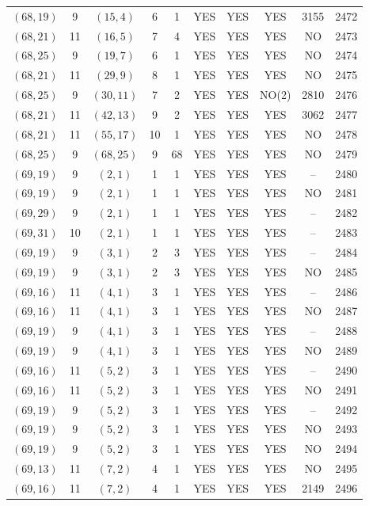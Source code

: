 \begin{longtable}{|c|c|c|c|c|c|c|c|c|c|}
$(68, 19)$ & 9 & $(15, 4)$ & 6 & 1 & YES & YES & YES & 3155 & 2472\\
$(68, 21)$ & 11 & $(16, 5)$ & 7 & 4 & YES & YES & YES & NO & 2473\\
$(68, 25)$ & 9 & $(19, 7)$ & 6 & 1 & YES & YES & YES & NO & 2474\\
$(68, 21)$ & 11 & $(29, 9)$ & 8 & 1 & YES & YES & YES & NO & 2475\\
$(68, 25)$ & 9 & $(30, 11)$ & 7 & 2 & YES & YES & NO(2) & 2810 & 2476\\
$(68, 21)$ & 11 & $(42, 13)$ & 9 & 2 & YES & YES & YES & 3062 & 2477\\
$(68, 21)$ & 11 & $(55, 17)$ & 10 & 1 & YES & YES & YES & NO & 2478\\
$(68, 25)$ & 9 & $(68, 25)$ & 9 & 68 & YES & YES & YES & NO & 2479\\
$(69, 19)$ & 9 & $(2, 1)$ & 1 & 1 & YES & YES & YES & -- & 2480\\
$(69, 19)$ & 9 & $(2, 1)$ & 1 & 1 & YES & YES & YES & NO & 2481\\
$(69, 29)$ & 9 & $(2, 1)$ & 1 & 1 & YES & YES & YES & -- & 2482\\
$(69, 31)$ & 10 & $(2, 1)$ & 1 & 1 & YES & YES & YES & -- & 2483\\
$(69, 19)$ & 9 & $(3, 1)$ & 2 & 3 & YES & YES & YES & -- & 2484\\
$(69, 19)$ & 9 & $(3, 1)$ & 2 & 3 & YES & YES & YES & NO & 2485\\
$(69, 16)$ & 11 & $(4, 1)$ & 3 & 1 & YES & YES & YES & -- & 2486\\
$(69, 16)$ & 11 & $(4, 1)$ & 3 & 1 & YES & YES & YES & NO & 2487\\
$(69, 19)$ & 9 & $(4, 1)$ & 3 & 1 & YES & YES & YES & -- & 2488\\
$(69, 19)$ & 9 & $(4, 1)$ & 3 & 1 & YES & YES & YES & NO & 2489\\
$(69, 16)$ & 11 & $(5, 2)$ & 3 & 1 & YES & YES & YES & -- & 2490\\
$(69, 16)$ & 11 & $(5, 2)$ & 3 & 1 & YES & YES & YES & NO & 2491\\
$(69, 19)$ & 9 & $(5, 2)$ & 3 & 1 & YES & YES & YES & -- & 2492\\
$(69, 19)$ & 9 & $(5, 2)$ & 3 & 1 & YES & YES & YES & NO & 2493\\
$(69, 19)$ & 9 & $(5, 2)$ & 3 & 1 & YES & YES & YES & NO & 2494\\
$(69, 13)$ & 11 & $(7, 2)$ & 4 & 1 & YES & YES & YES & NO & 2495\\
$(69, 16)$ & 11 & $(7, 2)$ & 4 & 1 & YES & YES & YES & 2149 & 2496\\

\end{longtable}
